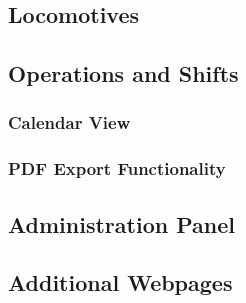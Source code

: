 \subsection{Locomotives}

\subsection{Operations and Shifts}

\subsubsection{Calendar View}

\subsubsection{PDF Export Functionality}

\subsection{Administration Panel}

\subsection{Additional Webpages}